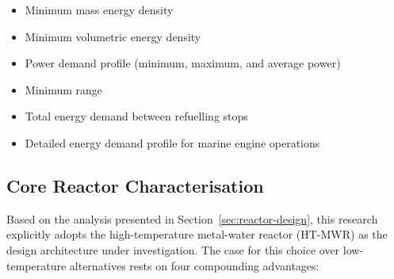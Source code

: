 \documentclass[12pt]{article}
\begin{document}
\begin{itemize}
    \item Minimum mass energy density
    \item Minimum volumetric energy density
    \item Power demand profile (minimum, maximum, and average power)
    \item Minimum range
    \item Total energy demand between refuelling stops
    \item Detailed energy demand profile for marine engine operations
\end{itemize}

\break

\subsection{Core Reactor Characterisation}
\label{sec:core-reactor-research-questions}

Based on the analysis presented in Section~\ref{sec:reactor-design}, this research 
explicitly adopts the high-temperature metal-water reactor (HT-MWR) as the design 
architecture under investigation. The case for this choice over low-temperature 
alternatives rests on four compounding advantages:
\end{document}

